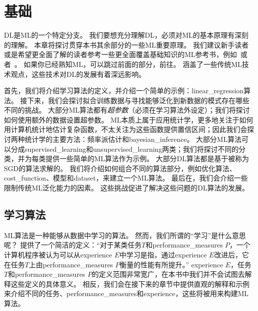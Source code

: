 \chapter{基础}
\label{chap:machine_learning_basics}
\gls{DL}是\gls{ML}的一个特定分支。
我们要想充分理解\gls{DL}，必须对\gls{ML}的基本原理有深刻的理解。
本章将探讨贯穿本书其余部分的一些\gls{ML}重要原理。
我们建议新手读者或是希望更全面了解的读者参考一些更全面覆盖基础知识的\gls{ML}参考书，例如~\cite{MurphyBook2012}或者~\cite{bishop-book2006}。
如果你已经熟知\gls{ML}，可以跳过前面的部分，前往。
涵盖了一些传统\gls{ML}技术观点，这些技术对\gls{DL}的发展有着深远影响。

首先，我们将介绍学习算法的定义，并介绍一个简单的示例：\gls{linear_regression}算法。
接下来，我们会探讨拟合训练数据与寻找能够泛化到新数据的模式存在哪些不同的挑战。
大部分\gls{ML}算法都有\emph{超参数}（必须在学习算法外设定）；我们将探讨如何使用额外的数据设置超参数。
\gls{ML}本质上属于应用统计学，更多地关注于如何用计算机统计地估计复杂函数，不太关注为这些函数提供置信区间；因此我们会探讨两种统计学的主要方法：频率派估计和\gls{bayesian_inference}。
大部分\gls{ML}算法可以分成\gls{supervised_learning}和\gls{unsupervised_learning}两类；我们将探讨不同的分类，并为每类提供一些简单的\gls{ML}算法作为示例。
大部分\gls{DL}算法都是基于被称为\gls{SGD}的算法求解的。
我们将介绍如何组合不同的算法部分，例如优化算法、\gls{cost_function}、模型和\gls{dataset}，来建立一个\gls{ML}算法。
最后在，我们会介绍一些限制传统\gls{ML}泛化能力的因素。
这些挑战促进了解决这些问题的\gls{DL}算法的发展。


\section{学习算法}
\label{sec:learning_algorithms}
\gls{ML}算法是一种能够从数据中学习的算法。
然而，我们所谓的``学习''是什么意思呢？
\cite{Mitchell:1997:ML}提供了一个简洁的定义：``对于某类任务$T$和\gls{performance_measures} $P$，一个计算机程序被认为可以从\gls{experience} $E$中学习是指，通过\gls{experience} $E$改进后，它在任务$T$上由\gls{performance_measures} $P$衡量的性能有所提升。''
\gls{experience} $E$，任务$T$和\gls{performance_measures} $P$的定义范围非常宽广，在本书中我们并不会试图去解释这些定义的具体意义。
相反，我们会在接下来的章节中提供直观的解释和示例来介绍不同的任务、\gls{performance_measures}和\gls{experience}，这些将被用来构建\gls{ML}算法。

